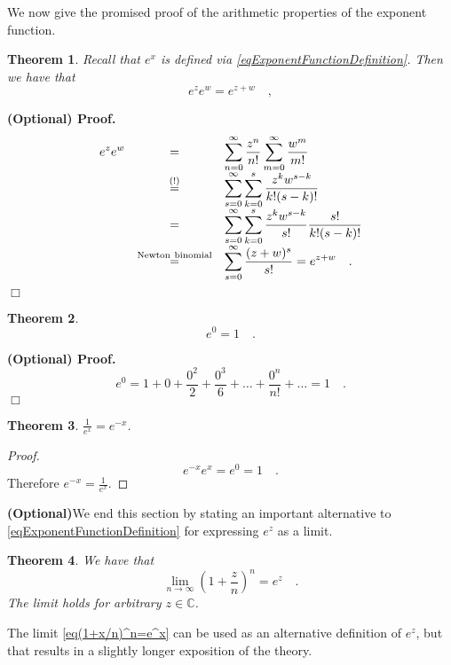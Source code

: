 \documentclass[12pt]{book}
\newcommand{\eqAttention}{\stackrel{(!)}{=}}
\newenvironment{proofOptional}[1][]{ \noindent \textbf{(Optional) Proof#1.}}{$\Box$\medskip}
\newtheorem{theorem}{Theorem}[section]
\newcommand{\optionalMaterial}{\textbf{(Optional)}}
\begin{document}
We now give the promised proof of the arithmetic properties of the exponent function.
\begin{theorem}\label{thExponentArgumentsAddWhenMultiplying}
Recall that $e^x$ is defined via \eqref{eqExponentFunctionDefinition}. Then we have that \begin{equation}\boxed{
e^{z} e^{w}=e^{z+w}\quad ,
}
\end{equation}
\end{theorem}
\begin{proofOptional}
\[
\begin{array}{rcl}
\displaystyle
\displaystyle e^{z} e^w&=&\displaystyle  \sum_{n=0}^{\infty} \frac{z^n}{n!} \sum_{m=0}^{\infty} \frac{w^m}{m!} \\ &\eqAttention&  \displaystyle  \sum_{s=0}^{\infty}\sum_{k=0 }^s \frac{z^{k}w^{s-k}}{k! (s-k)!} \\ &=& \displaystyle  \sum_{s=0}^{\infty}\sum_{k=0 }^s   \frac{z^{k}w^{s-k}}{s!} \frac{s!}{k! (s-k)!}\\ &\stackrel{\mathrm{Newton~binomial}}{=}& \displaystyle  \sum_{s=0}^{\infty} \frac{(z+w)^s}{s!}=e^{z+w}\quad .
\end{array}
\]
\end{proofOptional}
\begin{theorem}
\[
e^0=1\quad .
\]
\end{theorem}
\begin{proofOptional}
\[ e^0 = 1+ 0+ \frac{0^2}{2}+ \frac{0^3}{6}+\dots +\frac{0^n}{n!}+\dots = 1\quad .
\]
\end{proofOptional}

\begin{theorem}
$\frac{1}{e^{x}}= e^{-x}$\quad .
\end{theorem}
\begin{proof}
\[e^{-x}e^x=e^0 = 1\quad .
\]
Therefore $e^{-x}=\frac{1}{e^x}.$
\end{proof}

\optionalMaterial We end this section by stating an important alternative to \ref{eqExponentFunctionDefinition} for expressing $e^z$ as a limit.
\begin{theorem}\label{th(1+x/n)^n=e^x}
We have that
\begin{equation}\label{eq(1+x/n)^n=e^x}
\lim_{n\to \infty} \left(1+\frac{z}n\right)^n= e^z\quad .
\end{equation}
The limit holds for arbitrary $z\in \mathbb C$.
\end{theorem}
The limit \eqref{eq(1+x/n)^n=e^x} can be used as an alternative definition of $e^{z}$, but that results in a slightly longer exposition of the theory.
\end{document}
